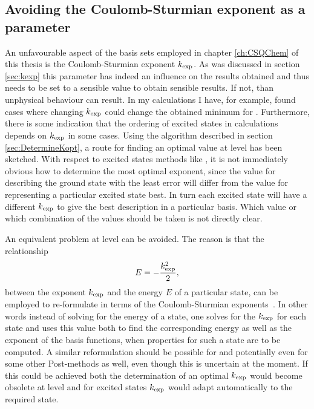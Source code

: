 \subsection{Avoiding the Coulomb-Sturmian exponent as a parameter}
An unfavourable aspect of the \CS basis sets
employed in chapter \ref{ch:CSQChem} of this thesis is
the Coulomb-Sturmian exponent $k_\text{exp}$.
As was discussed in section \ref{sec:kexp}
this parameter has indeed an influence on the results obtained
and thus needs to be set to a sensible value to obtain sensible results.
If not, than unphysical behaviour can result.
In my calculations I have, for example, found cases
where changing $k_\text{exp}$ could change the obtained \SCF minimum
for \HF.
Furthermore, there is some indication
that the ordering of excited states in \ADC calculations
depends on $k_\text{exp}$ in some cases.
Using the algorithm described in section \ref{sec:DetermineKopt},
a route for finding an optimal value at \HF level has been sketched.
With respect to excited states methods like \ADC,
it is not immediately obvious how to determine the most optimal exponent,
since the value for describing the ground state with the least error
will differ from the value for representing a particular excited state best.
In turn each excited state will have a different $k_\text{exp}$
to give the best description in a particular \CS basis.
Which value or which combination of the values should be taken
is not directly clear.

\noindent
An equivalent problem at \FCI level can be avoided.
The reason is that the relationship
\[ E = - \frac{k_\text{exp}^2}{2}, \]
between the \CS exponent $k_\text{exp}$ and the energy $E$ of a particular state,
can be employed to re-formulate \FCI in terms of the
Coulomb-Sturmian exponents~\cite{Avery2006}.
In other words instead of solving for the energy of a state,
one solves for the $k_\text{exp}$ for each state
and uses this value both to find the corresponding energy
as well as the exponent of the basis functions,
when properties for such a state are to be computed.
A similar reformulation should be possible for \HF
and potentially even for some other Post-\HF methods as well,
even though this is uncertain at the moment.
If this could be achieved both the determination of an optimal
$k_\text{exp}$ would become obsolete at \HF level
and for excited states $k_\text{exp}$ would adapt automatically to the required state.

